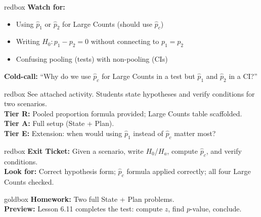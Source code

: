 \documentclass[10pt]{article}
\begin{document}
\begin{skillbox}{redbox}
    \textbf{Watch for:}
    \begin{itemize}[leftmargin=1.2em]
        \item Using $\hat p_1$ or $\hat p_2$ for Large Counts (should use $\hat p_c$)
        \item Writing $H_0: p_1 - p_2 = 0$ without connecting to $p_1=p_2$
        \item Confusing pooling (tests) with non-pooling (CIs)
    \end{itemize}
    \textbf{Cold-call:} ``Why do we use $\hat p_c$ for Large Counts in a test but $\hat p_1$
    and $\hat p_2$ in a CI?''
\end{skillbox}

\begin{skillbox}{redbox}
    See attached activity. Students state hypotheses and verify conditions for two scenarios.\\[4pt]
    \textbf{Tier R:} Pooled proportion formula provided; Large Counts table scaffolded.\\
    \textbf{Tier A:} Full setup (State + Plan).\\
    \textbf{Tier E:} Extension: when would using $\hat p_1$ instead of $\hat p_c$ matter most?
\end{skillbox}

\begin{skillbox}{redbox}
    \textbf{Exit Ticket:} Given a scenario, write $H_0$/$H_a$, compute $\hat p_c$, and verify
    conditions.\\[4pt]
    \textbf{Look for:} Correct hypothesis form; $\hat p_c$ formula applied correctly; all four Large Counts checked.
\end{skillbox}

\begin{skillbox}{goldbox}
    \textbf{Homework:} Two full State + Plan problems.\\[4pt]
    \textbf{Preview:} Lesson 6.11 completes the test: compute $z$, find $p$-value, conclude.
\end{skillbox}
\end{document}
